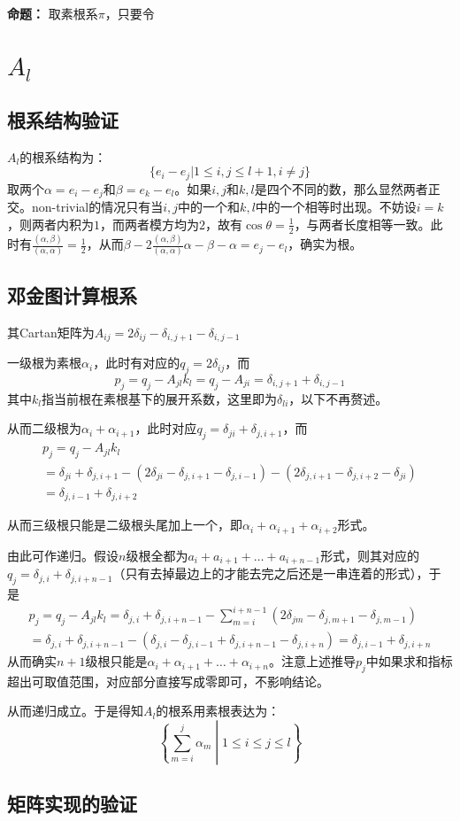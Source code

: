 \documentclass{ctexart}
\begin{document}
	\textbf{命题：} 取素根系$\pi$，只要令
	
	\section{$A_l$}
	\subsection{根系结构验证}
	
	$A_l$的根系结构为：
	\begin{equation}
	\{e_i-e_j|1\leq i,j\leq l+1,i\neq j\}
	\end{equation}
	取两个$\alpha=e_i-e_j$和$\beta=e_k-e_l$。如果$i,j$和$k,l$是四个不同的数，那么显然两者正交。non-trivial的情况只有当$i,j$中的一个和$k,l$中的一个相等时出现。不妨设$i=k$，则两者内积为$1$，而两者模方均为$2$，故有$\cos\theta=\frac{1}{2}$，与两者长度相等一致。此时有$\frac{(\alpha,\beta)}{(\alpha,\alpha)}=\frac{1}{2}$，从而$\beta-2\frac{(\alpha,\beta)}{(\alpha,\alpha)}\alpha-\beta-\alpha=e_j-e_l$，确实为根。
	
	\subsection{邓金图计算根系}
	
	其Cartan矩阵为$A_{ij}=2\delta_{ij}-\delta_{i,j+1}-\delta_{i,j-1}$
	
	一级根为素根$\alpha_i$，此时有对应的$q_j=2\delta_{ij}$，而
	\begin{equation}
	p_j=q_j-A_{jl}k_l=q_j-A_{ji}=\delta_{i,j+1}+\delta_{i,j-1}
	\end{equation}
	其中$k_l$指当前根在素根基下的展开系数，这里即为$\delta_{li}$，以下不再赘述。
	
	从而二级根为$\alpha_i+\alpha_{i+1}$，此时对应$q_j=\delta_{ji}+\delta_{j,i+1}$，而
	\begin{multline}
	p_j=q_j-A_{jl}k_l\\=\delta_{ji}+\delta_{j,i+1}-(2\delta_{ji}-\delta_{j,i+1}-\delta_{j,i-1})-(2\delta_{j,i+1}-\delta_{j,i+2}-\delta_{ji})\\=\delta_{j,i-1}+\delta_{j,i+2}
	\end{multline}
	
	从而三级根只能是二级根头尾加上一个，即$\alpha_i+\alpha_{i+1}+\alpha_{i+2}$形式。
	
	由此可作递归。假设$n$级根全都为$a_i+a_{i+1}+\dots+a_{i+n-1}$形式，则其对应的$q_j=\delta_{j,i}+\delta_{j,i+n-1}$（只有去掉最边上的才能去完之后还是一串连着的形式），于是
	\begin{multline}
	p_j=q_j-A_{jl}k_l=\delta_{j,i}+\delta_{j,i+n-1}-\sum_{m=i}^{i+n-1}(2\delta_{jm}-\delta_{j,m+1}-\delta_{j,m-1})\\=\delta_{j,i}+\delta_{j,i+n-1}-(\delta_{j,i}-\delta_{j,i-1}+\delta_{j,i+n-1}-\delta_{j,i+n})=\delta_{j,i-1}+\delta_{j,i+n}
	\end{multline}
	从而确实$n+1$级根只能是$\alpha_i+\alpha_{i+1}+\dots+\alpha_{i+n}$。注意上述推导$p_j$中如果求和指标超出可取值范围，对应部分直接写成零即可，不影响结论。
	
	从而递归成立。于是得知$A_l$的根系用素根表达为：
	\begin{equation}
	\left\{\sum_{m=i}^{j}\alpha_m\middle|1\leq i\leq j\leq l\right\}
	\end{equation}
	
	\subsection{矩阵实现的验证}
	
	
	
\end{document}
